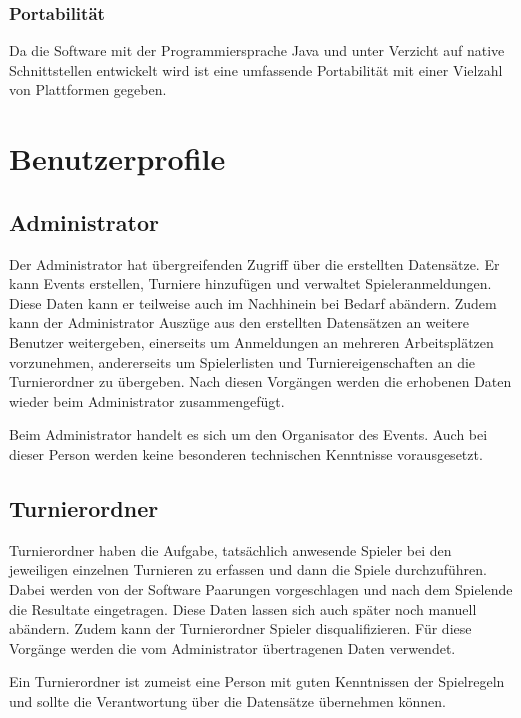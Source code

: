 \documentclass[11pt]{article}
\begin{document}
\subsubsection{Portabilität}

Da die Software mit der Programmiersprache Java und unter Verzicht auf native Schnittstellen entwickelt wird ist eine umfassende Portabilität mit einer Vielzahl von Plattformen gegeben.

\newpage

\section{Benutzerprofile}

\subsection{Administrator}

Der Administrator hat übergreifenden Zugriff über die erstellten Datensätze. Er kann Events erstellen, Turniere hinzufügen und verwaltet Spieleranmeldungen. Diese Daten kann er teilweise auch im Nachhinein bei Bedarf abändern. Zudem kann der Administrator Auszüge aus den erstellten Datensätzen an weitere Benutzer weitergeben, einerseits um Anmeldungen an mehreren Arbeitsplätzen vorzunehmen, andererseits um Spielerlisten und Turniereigenschaften an die Turnierordner zu übergeben. Nach diesen Vorgängen werden die erhobenen Daten wieder beim Administrator zusammengefügt.

Beim Administrator handelt es sich um den Organisator des Events. Auch bei dieser Person werden keine besonderen technischen Kenntnisse vorausgesetzt.

\subsection{Turnierordner}

Turnierordner haben die Aufgabe, tatsächlich anwesende Spieler bei den jeweiligen einzelnen Turnieren zu erfassen und dann die Spiele durchzuführen. Dabei werden von der Software Paarungen vorgeschlagen und nach dem Spielende die Resultate eingetragen. Diese Daten lassen sich auch später noch manuell abändern. Zudem kann der Turnierordner Spieler disqualifizieren. Für diese Vorgänge werden die vom Administrator übertragenen Daten verwendet.

Ein Turnierordner ist zumeist eine Person mit guten Kenntnissen der Spielregeln und sollte die Verantwortung über die Datensätze übernehmen können.
\end{document}

